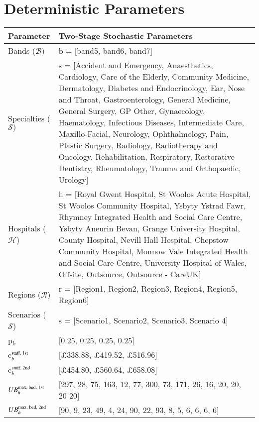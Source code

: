 \documentclass[thesis.tex]{subfiles}
\begin{document}
\section{Deterministic Parameters}
{\footnotesize
\begin{longtable}{lp{12cm}}\toprule
\textbf{Parameter} & \textbf{Two-Stage Stochastic Parameters} \\ \midrule
Bands ($\mathcal{B})$ & b = [band5, band6, band7]\\  \midrule
Specialties ($\mathcal{S})$ & s = [Accident and Emergency, Anaesthetics, Cardiology, Care of the Elderly, Community Medicine, Dermatology, Diabetes and Endocrinology, Ear, Nose and Throat, Gastroenterology, General Medicine, General Surgery, GP Other, Gynaecology, Haematology, Infectious Diseases, Intermediate Care, Maxillo-Facial, Neurology, Ophthalmology, Pain, Plastic Surgery, Radiology, Radiotherapy and Oncology, Rehabilitation, Respiratory, Restorative Dentistry, Rheumatology, Trauma and Orthopaedic, Urology]\\\midrule
Hospitals ($\mathcal{H}$) & h = [Royal Gwent Hospital, St Woolos Acute Hospital, St Woolos Community Hospital, Ysbyty Ystrad Fawr, Rhymney Integrated Health and Social Care Centre, Ysbyty Aneurin Bevan, Grange University Hospital, County Hospital, Nevill Hall Hospital, Chepstow Community Hospital, Monnow Vale Integrated Health and Social Care Centre, University Hospital of Wales, Offsite, Outsource, Outsource - CareUK] \\\midrule
Regions ($\mathcal{R}$) & r = [Region1, Region2, Region3, Region4, Region5, Region6]\\\midrule
Scenarios ($\mathcal{S}$) & s = [Scenario1, Scenario2, Scenario3, Scenario 4]\\\midrule
p$_{k}$ & [0.25, 0.25, 0.25, 0.25] \\\midrule
c$^\textnormal{staff, 1st}_{b}$ & [$\pounds$338.88,	$\pounds$419.52, $\pounds$516.96]\\\midrule
c$^\textnormal{staff, 2nd}_{b}$ & [$\pounds$454.80,	$\pounds$560.64, $\pounds$658.08] \\\midrule
$UB^\textnormal{max, bed, 1st}_{h}$ & [297, 28, 75, 163, 12, 77, 300, 73, 171, 26, 16, 20, 20, 20 20]	   \\\midrule
$UB^\textnormal{max, bed, 2nd}_{h}$ & [90, 9, 23, 49, 4, 24, 90, 22, 93, 8, 5, 6, 6, 6, 6]	   \\\midrule
     

\end{longtable}}
\end{document}
